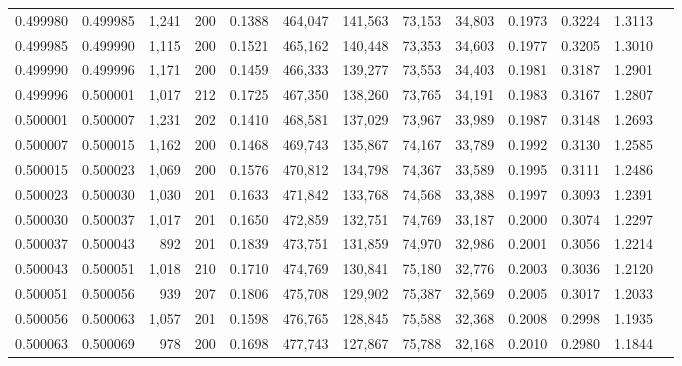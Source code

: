 \begin{tabular}{rrrrrrrrrrrrr}
0.499980 & 0.499985 & 1,241 & 200 &                                     0.1388 & 464,047 & 141,563 &  73,153 &  34,803 & 0.1973 & 0.3224 & 1.3113 \\
0.499985 & 0.499990 & 1,115 & 200 &                                     0.1521 & 465,162 & 140,448 &  73,353 &  34,603 & 0.1977 & 0.3205 & 1.3010 \\
0.499990 & 0.499996 & 1,171 & 200 &                                     0.1459 & 466,333 & 139,277 &  73,553 &  34,403 & 0.1981 & 0.3187 & 1.2901 \\
0.499996 & 0.500001 & 1,017 & 212 &                                     0.1725 & 467,350 & 138,260 &  73,765 &  34,191 & 0.1983 & 0.3167 & 1.2807 \\
0.500001 & 0.500007 & 1,231 & 202 &                                     0.1410 & 468,581 & 137,029 &  73,967 &  33,989 & 0.1987 & 0.3148 & 1.2693 \\
0.500007 & 0.500015 & 1,162 & 200 &                                     0.1468 & 469,743 & 135,867 &  74,167 &  33,789 & 0.1992 & 0.3130 & 1.2585 \\
0.500015 & 0.500023 & 1,069 & 200 &                                     0.1576 & 470,812 & 134,798 &  74,367 &  33,589 & 0.1995 & 0.3111 & 1.2486 \\
0.500023 & 0.500030 & 1,030 & 201 &                                     0.1633 & 471,842 & 133,768 &  74,568 &  33,388 & 0.1997 & 0.3093 & 1.2391 \\
0.500030 & 0.500037 & 1,017 & 201 &                                     0.1650 & 472,859 & 132,751 &  74,769 &  33,187 & 0.2000 & 0.3074 & 1.2297 \\
0.500037 & 0.500043 &   892 & 201 &                                     0.1839 & 473,751 & 131,859 &  74,970 &  32,986 & 0.2001 & 0.3056 & 1.2214 \\
0.500043 & 0.500051 & 1,018 & 210 &                                     0.1710 & 474,769 & 130,841 &  75,180 &  32,776 & 0.2003 & 0.3036 & 1.2120 \\
0.500051 & 0.500056 &   939 & 207 &                                     0.1806 & 475,708 & 129,902 &  75,387 &  32,569 & 0.2005 & 0.3017 & 1.2033 \\
0.500056 & 0.500063 & 1,057 & 201 &                                     0.1598 & 476,765 & 128,845 &  75,588 &  32,368 & 0.2008 & 0.2998 & 1.1935 \\
0.500063 & 0.500069 &   978 & 200 &                                     0.1698 & 477,743 & 127,867 &  75,788 &  32,168 & 0.2010 & 0.2980 & 1.1844 \\

\end{tabular}
